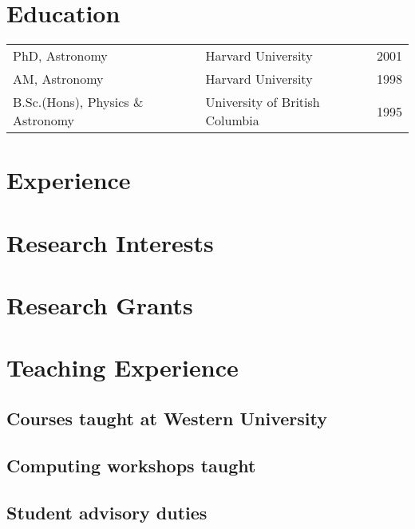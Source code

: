 \documentclass[12pt]{article}
\begin{document}
\maketitle

\section{Education}
\begin{tabularx}{\textwidth}{lXr}
PhD, Astronomy & Harvard University & 2001\\
AM, Astronomy & Harvard University & 1998\\
B.Sc.(Hons),  Physics \& Astronomy & University of British Columbia&1995\\
\end{tabularx}

\section{Experience} 


\section{Research Interests}



\section{Research Grants}



\clearpage

\section{Teaching Experience}

\subsection{Courses taught at Western University}


\subsection{Computing workshops taught} 


\subsection{Student advisory duties}

\end{document}
